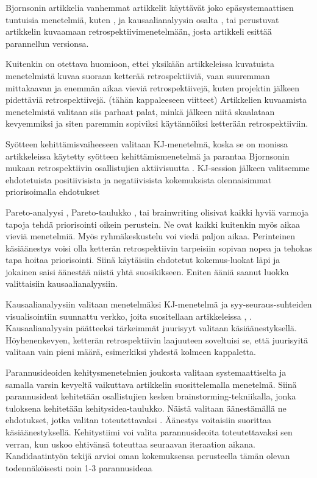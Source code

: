 Bj{o}rnsonin artikkelia vanhemmat artikkelit käyttävät joko epäsystemaattisen tuntuisia menetelmiä, kuten \citep{karlsson2006case}, \citep{staalhane2003post} ja kausaalianalyysin osalta \citep{card1998learning}, tai perustuvat artikkelin \citep{birk2002postmortem} kuvaamaan retrospektiivimenetelmään, josta artikkeli \citep{Bjornson2009} esittää parannellun versionsa.

Kuitenkin on otettava huomioon, ettei yksikään artikkeleissa kuvatuista menetelmistä kuvaa suoraan ketterää retrospektiiviä, vaan suuremman mittakaavan ja enemmän aikaa vieviä retrospektiivejä, kuten projektin jälkeen pidettäviä retrospektiivejä. (tähän kappaleeseen viitteet) Artikkelien kuvaamista menetelmistä valitaan siis parhaat palat, minkä jälkeen niitä skaalataan kevyemmiksi ja siten paremmin sopiviksi käytännöiksi ketterään retrospektiiviin.

Syötteen kehittämisvaiheeseen valitaan KJ-menetelmä, koska se on monissa artikkeleissa käytetty syötteen kehittämismenetelmä ja parantaa Bj{o}rnsonin mukaan retrospektiivin osallistujien aktiivisuutta \citep{Bjornson2009}. KJ-session jälkeen valitsemme ehdotetuista positiivisista ja negatiivisista kokemuksista olennaisimmat priorisoimalla ehdotukset

Pareto-analyysi \citep{staalhane2004root}, Pareto-taulukko \citep{card1998learning}, \citep{kalinowski2012evidence} tai brainwriting \citep{Lehtinen2011} olisivat kaikki hyviä varmoja tapoja tehdä priorisointi oikein perustein. Ne ovat kaikki kuitenkin myös aikaa vieviä menetelmiä. Myös ryhmäkeskustelu \citep{staalhane2003post} voi viedä paljon aikaa. Perinteinen käsiäänestys voisi olla ketterän retrospektiivin tarpeisiin sopivan nopea ja tehokas tapa hoitaa priorisointi. Siinä käytäisiin ehdotetut kokemus-luokat läpi ja jokainen saisi äänestää niistä yhtä suosikikseen. Eniten ääniä saanut luokka valittaisiin kausaalianalyysiin.

Kausaalianalyysiin valitaan menetelmäksi KJ-menetelmä ja syy-seuraus-suhteiden visualisointiin suunnattu verkko, joita suositellaan artikkeleissa \citep{Lehtinen2011}, \citep{Bjornson2009}. Kausaalianalyysin päätteeksi tärkeimmät juurisyyt valitaan käsiäänestyksellä. Höyhenenkevyen, ketterän retrospektiivin laajuuteen soveltuisi se, että juurisyitä valitaan vain pieni määrä, esimerkiksi yhdestä kolmeen kappaletta.

Parannusideoiden kehitysmenetelmien joukosta valitaan systemaattiselta ja samalla varsin kevyeltä vaikuttava artikkelin \citep{staalhane2004root} suosittelemalla menetelmä. Siinä parannusideat kehitetään osallistujien kesken brainstorming-tekniikalla, jonka tuloksena kehitetään kehitysidea-taulukko. Näistä valitaan äänestämällä ne ehdotukset, jotka valitan toteutettavaksi \citep{staalhane2004root}. Äänestys voitaisiin suorittaa käsiäänestyksellä. Kehitystiimi voi valita parannusideoita toteutettavaksi sen verran, kun uskoo ehtivänsä toteuttaa seuraavan iteraation aikana. Kandidaatintyön tekijä arvioi oman kokemuksensa perusteella tämän olevan todennäköisesti noin 1-3 parannusideaa


